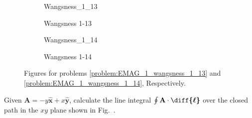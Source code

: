 \documentclass[crop=false,class=book,oneside]{standalone}
\begin{document}
            \begin{figure}[H]
                \centering
                \captionsetup{type=figure}
                \begin{subfigure}[b]{0.49\textwidth}
                    \centering
                    \captionsetup{type=figure}
                    {Wangsness_1_13}
                \caption{Wangsness 1-13}
                \label{fig:EMAG_1_wangsness_1_13_region_of_integration}
                \end{subfigure}
                \begin{subfigure}[b]{0.49\textwidth}
                    \centering
                    \captionsetup{type=figure}
                    {Wangsness_1_14}
                    \caption{Wangsness 1-14}
                    \label{fig:EMAG_1_wangsness_1_14}
                \end{subfigure}
                \caption[Figures for Wangsness 1-13 and 1-14]
                {Figures for problems
                \ref{problem:EMAG_1_wangsness_1_13} and
                \ref{problem:EMAG_1_wangsness_1_14}, Respectively.}
            \end{figure}
            \begin{problem}[Wangsness 1-14]
                \label{problem:EMAG_1_wangsness_1_14}
                Given $\mathbf{A}=-y\hat{\mathbf{x}}+x\hat{\mathbf{y}}$,
                calculate the line integral
                $\oint\mathbf{A}\cdot\boldsymbol{\diff{\ell}}$
                over the closed path in the $xy$
                plane shown in
                Fig.~.
            \end{problem}
\end{document}
